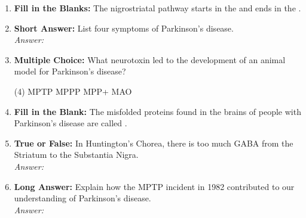 \begin{enumerate}[label=\textbf{Q3.5.\arabic*}]
    \item \textbf{Fill in the Blanks:} The nigrostriatal pathway starts in the \underline{\hspace{3cm}} and ends in the \underline{\hspace{3cm}}.

    \item \textbf{Short Answer:} List four symptoms of Parkinson's disease. \\
        \textit{Answer:} %

    \item \textbf{Multiple Choice:} What neurotoxin led to the development of an animal model for Parkinson's disease?
        \begin{tasks}[label=\textcolor{\documentTheme}{(\Alph*)}, item-format=\color{\documentTheme}, label-width=1.5em, item-indent=1.7em](4)
            \task MPTP
            \task MPPP
            \task MPP+
            \task MAO
        \end{tasks}

    \item \textbf{Fill in the Blank:} The misfolded proteins found in the brains of people with Parkinson's disease are called \underline{\hspace{3cm}}.

    \item \textbf{True or False:} In Huntington's Chorea, there is too much GABA from the Striatum to the Substantia Nigra. \\
        \textit{Answer:} %

    \item \textbf{Long Answer:} Explain how the MPTP incident in 1982 contributed to our understanding of Parkinson's disease. \\
        \textit{Answer:} \\[2cm] %


\end{enumerate}
